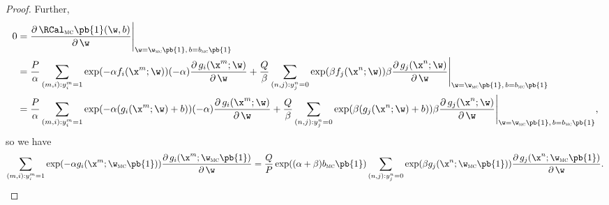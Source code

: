 \begin{proof}
Further,
\begin{equation*}
\begin{aligned}
0 
&= \frac{\partial \, \RCal_\textsc{mc}\pb{1}(\w, b)} {\partial \, \w} \Bigg|_{\w = \w_\textsc{mc}\pb{1}, \, b = b_\textsc{mc}\pb{1}} \\
&= \frac{P}{\alpha} \sum_{(m,i): y_i^m = 1} \exp(-\alpha f_i(\x^m; \w)) (-\alpha) \frac{\partial \, g_i(\x^m; \w)}{\partial \, \w} +
   \frac{Q}{\beta } \sum_{(n,j): y_j^n = 0} \exp( \beta  f_j(\x^n; \w)) \beta     \frac{\partial \, g_j(\x^n; \w)}{\partial \, \w}
   \Bigg|_{\w = \w_\textsc{mc}\pb{1}, \, b = b_\textsc{mc}\pb{1}} \\
&= \frac{P}{\alpha} \sum_{(m,i): y_i^m = 1} \exp(-\alpha (g_i(\x^m; \w) + b)) (-\alpha) \frac{\partial \, g_i(\x^m; \w)}{\partial \, \w} +
   \frac{Q}{\beta } \sum_{(n,j): y_j^n = 0} \exp( \beta  (g_j(\x^n; \w) + b)) \beta     \frac{\partial \, g_j(\x^n; \w)}{\partial \, \w}
   \Bigg|_{\w = \w_\textsc{mc}\pb{1}, \, b = b_\textsc{mc}\pb{1}},
\end{aligned}
\end{equation*}
so we have
\begin{equation}
\label{eq:grad_mc_eq0}
\begin{aligned}
\sum_{(m,i): y_i^m = 1} \exp(-\alpha g_i(\x^m; \w_\textsc{mc}\pb{1})) \frac{\partial \, g_i(\x^m; \w_\textsc{mc}\pb{1})}{\partial \, \w} 
= \frac{Q}{P} \exp((\alpha + \beta) b_\textsc{mc}\pb{1}) 
  \sum_{(n,j): y_j^n = 0} \exp(\beta g_j(\x^n; \w_\textsc{mc}\pb{1})) \frac{\partial \, g_j(\x^n; \w_\textsc{mc}\pb{1})}{\partial \, \w}.
\end{aligned}
\end{equation}


\end{proof}
